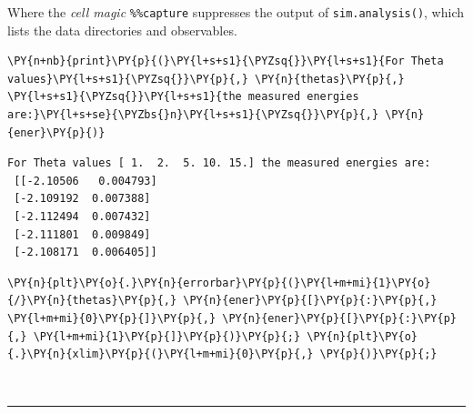     Where the \emph{cell magic} \texttt{\%\%capture} suppresses the output
of \texttt{sim.analysis()}, which lists the data directories and
observables.

    \begin{tcolorbox}[breakable, size=fbox, boxrule=1pt, pad at break*=1mm,colback=cellbackground, colframe=cellborder]
\begin{Verbatim}[commandchars=\\\{\}]
\PY{n+nb}{print}\PY{p}{(}\PY{l+s+s1}{\PYZsq{}}\PY{l+s+s1}{For Theta values}\PY{l+s+s1}{\PYZsq{}}\PY{p}{,} \PY{n}{thetas}\PY{p}{,} \PY{l+s+s1}{\PYZsq{}}\PY{l+s+s1}{the measured energies are:}\PY{l+s+se}{\PYZbs{}n}\PY{l+s+s1}{\PYZsq{}}\PY{p}{,} \PY{n}{ener}\PY{p}{)}
\end{Verbatim}
\end{tcolorbox}

    \begin{Verbatim}[commandchars=\\\{\}]
For Theta values [ 1.  2.  5. 10. 15.] the measured energies are:
 [[-2.10506   0.004793]
 [-2.109192  0.007388]
 [-2.112494  0.007432]
 [-2.111801  0.009849]
 [-2.108171  0.006405]]
    \end{Verbatim}

    \begin{tcolorbox}[breakable, size=fbox, boxrule=1pt, pad at break*=1mm,colback=cellbackground, colframe=cellborder]
\begin{Verbatim}[commandchars=\\\{\}]
\PY{n}{plt}\PY{o}{.}\PY{n}{errorbar}\PY{p}{(}\PY{l+m+mi}{1}\PY{o}{/}\PY{n}{thetas}\PY{p}{,} \PY{n}{ener}\PY{p}{[}\PY{p}{:}\PY{p}{,} \PY{l+m+mi}{0}\PY{p}{]}\PY{p}{,} \PY{n}{ener}\PY{p}{[}\PY{p}{:}\PY{p}{,} \PY{l+m+mi}{1}\PY{p}{]}\PY{p}{)}\PY{p}{;} \PY{n}{plt}\PY{o}{.}\PY{n}{xlim}\PY{p}{(}\PY{l+m+mi}{0}\PY{p}{,} \PY{p}{)}\PY{p}{;}
\end{Verbatim}
\end{tcolorbox}

    \begin{center}
    \end{center}
    { \hspace*{\fill} \\}
    
    \begin{center}\rule{0.5\linewidth}{\linethickness}\end{center}

